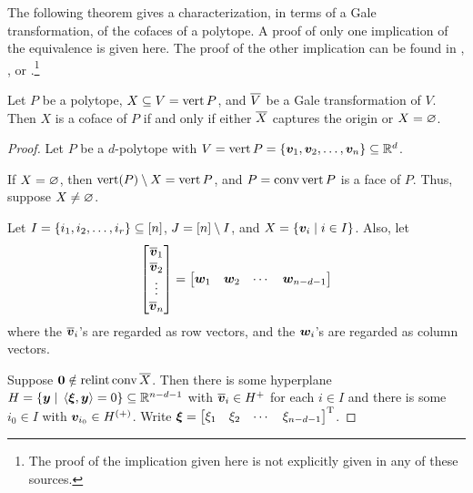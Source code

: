 The following theorem gives a characterization, in terms of a Gale transformation, of the cofaces of a polytope.  A proof of only one implication of the equivalence is given here.  The proof of the other implication can be found in \cite{GrunBook}, \cite{McMullenBook}, or \cite{Thomas}.\footnote{The proof of the implication given here is not explicitly given in any of these sources.}
\begin{Theorem}\label{Thm:CofaceIFF}
    Let \(P\) be a polytope, \(X\subseteq V=\operatorname{vert} P\), and \(\overline{V}\) be a Gale transformation of \(V\).  Then \(X\) is a coface of \(P\) if and only if either \(\overline{X}\) captures the origin or \(X=\varnothing\).
\end{Theorem}
\begin{proof}
    Let \(P\) be a \(d\)-polytope with \(V=\operatorname{vert} P=\left\{\bm{v}_1,\bm{v}_2,\dotsc,\bm{v}_n\right\}\subseteq\mathbb{R}^{d}\).

    If \(X=\varnothing\), then \(\operatorname{vert}(P)\setminus X=\operatorname{vert} P\), and \(P=\operatorname{conv}\operatorname{vert} P\) is a face of \(P\).  Thus, suppose \(X\ne\varnothing\).

    Let \(I=\left\{i_1,i_2,\dotsc, i_r\right\}\subseteq\left[n\right]\), \(J=\left[n\right]\setminus I\), and \(X=\setb{\ve v_i}{i\in I}\).  Also, let
        \[
            \begin{bmatrix}
                \overline{\bm{v}}_1\\ \overline{\bm{v}}_2\\ \vdots\\ \overline{\bm{v}}_n
            \end{bmatrix}
                =
                \begin{bmatrix}
                    \bm{w}_1&\bm{w}_2&\cdots&\bm{w}_{n-d-1}
                \end{bmatrix}
        \]
    where the \(\overline{\bm{v}}_i\)'s are regarded as row vectors, and the \(\bm{w}_i\)'s are regarded as column vectors.

    Suppose \(\bm{0}\notin\operatorname{relint}\operatorname{conv}\overline{X}\).  Then there is some hyperplane \(H=\setb{\ve y}{\ip{\ve\xi}{\ve y}=0}\sbset\R{n-d-1}\) with \(\overline{\bm{v}}_i\in H^+\) for each \(i\in I\) and there is some \(i_0\in I\) with \(\bm{v}_{i_0}\in H^{(+)}\).  Write \(\bm{\xi}={\begin{bmatrix}\xi_1&\xi_2&\cdots&\xi_{n-d-1}\end{bmatrix}}^{\mathrm{T}}\).


\end{proof}
